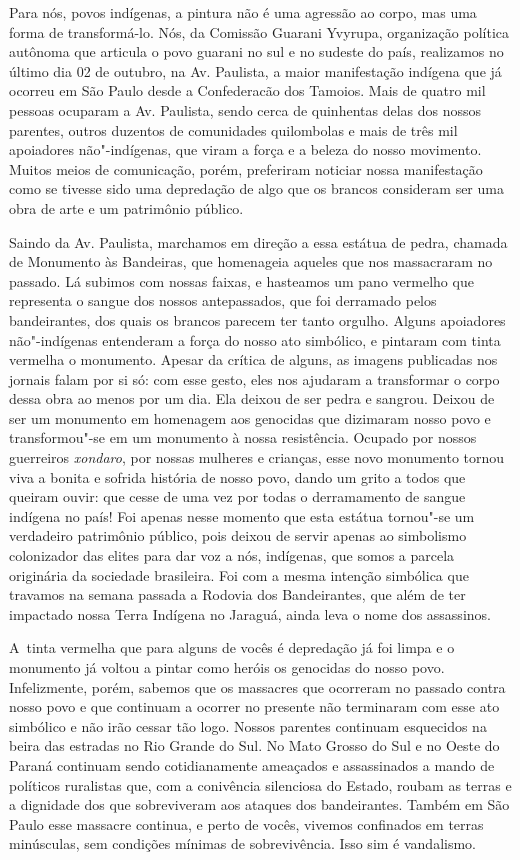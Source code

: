 \noindent
Para nós, povos indígenas, a pintura não é uma agressão ao corpo, mas
uma forma de transformá-lo. Nós, da Comissão Guarani Yvyrupa,
organização política autônoma que articula o povo guarani no sul
e no sudeste do país, realizamos no último dia 02 de outubro, na Av.
Paulista, a maior manifestação indígena que já ocorreu em São Paulo
desde a Confederacão dos Tamoios. Mais de quatro mil pessoas ocuparam a
Av. Paulista, sendo cerca de quinhentas delas dos nossos parentes,
outros duzentos de comunidades quilombolas e mais de três mil
apoiadores não"-indígenas, que viram a força e a beleza do nosso
movimento. Muitos meios de comunicação, porém, preferiram noticiar
nossa manifestação como se tivesse sido uma depredação de algo que os
brancos consideram ser uma obra de arte e um patrimônio público. 

Saindo da Av. Paulista, marchamos em direção a essa estátua de pedra,
chamada de Monumento às Bandeiras, que homenageia aqueles que nos
massacraram no passado. Lá subimos com nossas faixas, e hasteamos um
pano vermelho que representa o sangue dos nossos antepassados, que foi
derramado pelos bandeirantes, dos quais os brancos parecem ter tanto
orgulho. Alguns apoiadores não"-indígenas entenderam a força do nosso
ato simbólico, e pintaram com tinta vermelha o monumento. Apesar da
crítica de alguns, as imagens publicadas nos jornais falam por si só:
com esse gesto, eles nos ajudaram a transformar o corpo dessa obra ao
menos por um dia. Ela deixou de ser pedra e sangrou. Deixou de ser um
monumento em homenagem aos genocidas que dizimaram nosso povo e
transformou"-se em um monumento à nossa resistência. Ocupado por nossos
guerreiros \emph{xondaro}, por nossas mulheres e crianças, esse novo
monumento tornou viva a bonita e sofrida história de nosso povo, dando
um grito a todos que queiram ouvir: que cesse de uma vez por todas o
derramamento de sangue indígena no país! Foi apenas nesse momento que
esta estátua tornou"-se um verdadeiro patrimônio público, pois deixou de
servir apenas ao simbolismo colonizador das elites para dar voz a nós,
indígenas, que somos a parcela originária da sociedade brasileira. Foi
com a mesma intenção simbólica que travamos na semana passada a Rodovia
dos Bandeirantes, que além de ter impactado nossa Terra Indígena no
Jaraguá, ainda leva o nome dos assassinos.

A~tinta vermelha que para alguns de vocês é depredação já foi limpa e o
monumento já voltou a pintar como heróis os genocidas do nosso povo.
Infelizmente, porém, sabemos que os massacres que ocorreram no passado
contra nosso povo e que continuam a ocorrer no presente não terminaram
com esse ato simbólico e não irão cessar tão logo. Nossos parentes
continuam esquecidos na beira das estradas no Rio Grande do Sul. No
Mato Grosso do Sul e no Oeste do Paraná continuam sendo cotidianamente
ameaçados e assassinados a mando de políticos ruralistas que, com
a conivência silenciosa do Estado, roubam as terras e a dignidade dos
que sobreviveram aos ataques dos bandeirantes. Também em São Paulo esse
massacre continua, e perto de vocês, vivemos confinados em terras
minúsculas, sem condições mínimas de sobrevivência. Isso sim é
vandalismo.

